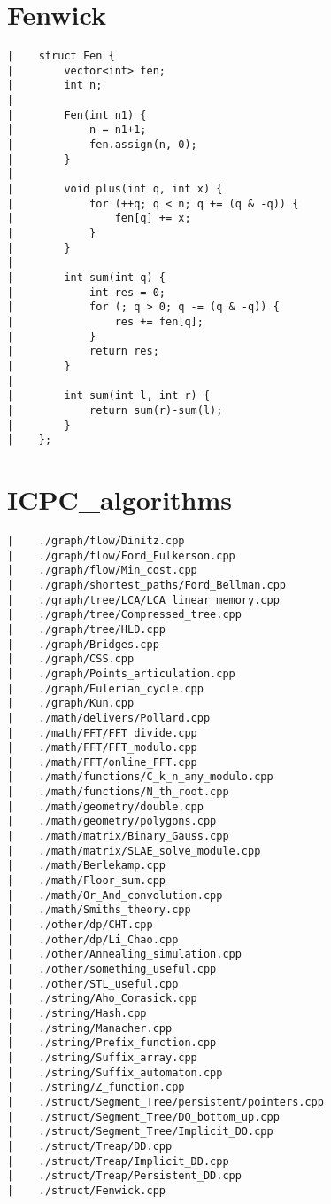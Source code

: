 \documentclass[a4paper, 10pt]{article}
\begin{document}
\begin{center}
\section*{Fenwick}
\begin{verbatim}
|    struct Fen {
|        vector<int> fen;
|        int n;
|    
|        Fen(int n1) {
|            n = n1+1;
|            fen.assign(n, 0);
|        }
|    
|        void plus(int q, int x) {
|            for (++q; q < n; q += (q & -q)) {
|                fen[q] += x;
|            }
|        }
|    
|        int sum(int q) {
|            int res = 0;
|            for (; q > 0; q -= (q & -q)) {
|                res += fen[q];
|            }
|            return res;
|        }
|    
|        int sum(int l, int r) {
|            return sum(r)-sum(l);
|        }
|    };
\end{verbatim}

\newpage
\section*{ICPC\_algorithms}
\begin{verbatim}
|    ./graph/flow/Dinitz.cpp
|    ./graph/flow/Ford_Fulkerson.cpp
|    ./graph/flow/Min_cost.cpp
|    ./graph/shortest_paths/Ford_Bellman.cpp
|    ./graph/tree/LCA/LCA_linear_memory.cpp
|    ./graph/tree/Compressed_tree.cpp
|    ./graph/tree/HLD.cpp
|    ./graph/Bridges.cpp
|    ./graph/CSS.cpp
|    ./graph/Points_articulation.cpp
|    ./graph/Eulerian_cycle.cpp
|    ./graph/Kun.cpp
|    ./math/delivers/Pollard.cpp
|    ./math/FFT/FFT_divide.cpp
|    ./math/FFT/FFT_modulo.cpp
|    ./math/FFT/online_FFT.cpp
|    ./math/functions/C_k_n_any_modulo.cpp
|    ./math/functions/N_th_root.cpp
|    ./math/geometry/double.cpp
|    ./math/geometry/polygons.cpp
|    ./math/matrix/Binary_Gauss.cpp
|    ./math/matrix/SLAE_solve_module.cpp
|    ./math/Berlekamp.cpp
|    ./math/Floor_sum.cpp
|    ./math/Or_And_convolution.cpp
|    ./math/Smiths_theory.cpp
|    ./other/dp/CHT.cpp
|    ./other/dp/Li_Chao.cpp
|    ./other/Annealing_simulation.cpp
|    ./other/something_useful.cpp
|    ./other/STL_useful.cpp
|    ./string/Aho_Corasick.cpp
|    ./string/Hash.cpp
|    ./string/Manacher.cpp
|    ./string/Prefix_function.cpp
|    ./string/Suffix_array.cpp
|    ./string/Suffix_automaton.cpp
|    ./string/Z_function.cpp
|    ./struct/Segment_Tree/persistent/pointers.cpp
|    ./struct/Segment_Tree/DO_bottom_up.cpp
|    ./struct/Segment_Tree/Implicit_DO.cpp
|    ./struct/Treap/DD.cpp
|    ./struct/Treap/Implicit_DD.cpp
|    ./struct/Treap/Persistent_DD.cpp
|    ./struct/Fenwick.cpp
\end{verbatim}

\end{center}
\end{document}
